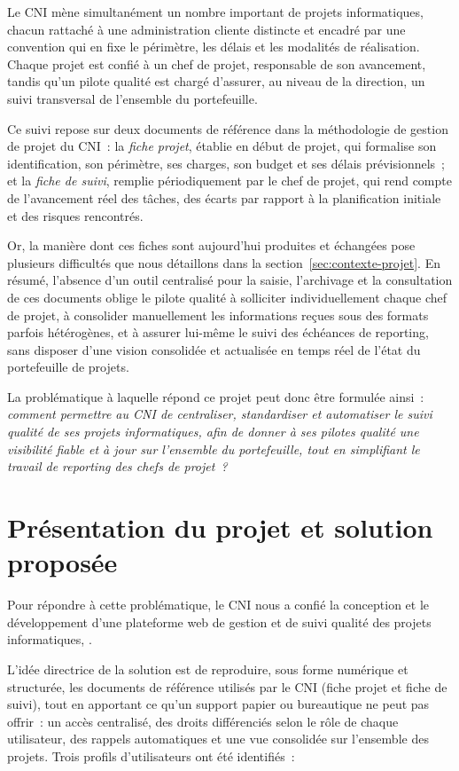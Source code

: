 Le CNI mène simultanément un nombre important de projets informatiques, chacun rattaché à une administration cliente distincte et encadré par une convention qui en fixe le périmètre, les délais et les modalités de réalisation. Chaque projet est confié à un chef de projet, responsable de son avancement, tandis qu'un pilote qualité est chargé d'assurer, au niveau de la direction, un suivi transversal de l'ensemble du portefeuille.

Ce suivi repose sur deux documents de référence dans la méthodologie de gestion de projet du CNI~: la \emph{fiche projet}, établie en début de projet, qui formalise son identification, son périmètre, ses charges, son budget et ses délais prévisionnels~; et la \emph{fiche de suivi}, remplie périodiquement par le chef de projet, qui rend compte de l'avancement réel des tâches, des écarts par rapport à la planification initiale et des risques rencontrés.

Or, la manière dont ces fiches sont aujourd'hui produites et échangées pose plusieurs difficultés que nous détaillons dans la section~\ref{sec:contexte-projet}. En résumé, l'absence d'un outil centralisé pour la saisie, l'archivage et la consultation de ces documents oblige le pilote qualité à solliciter individuellement chaque chef de projet, à consolider manuellement les informations reçues sous des formats parfois hétérogènes, et à assurer lui-même le suivi des échéances de reporting, sans disposer d'une vision consolidée et actualisée en temps réel de l'état du portefeuille de projets.

La problématique à laquelle répond ce projet peut donc être formulée ainsi~: \emph{comment permettre au CNI de centraliser, standardiser et automatiser le suivi qualité de ses projets informatiques, afin de donner à ses pilotes qualité une visibilité fiable et à jour sur l'ensemble du portefeuille, tout en simplifiant le travail de reporting des chefs de projet~?}

\section{Présentation du projet et solution proposée}
\label{sec:presentation-projet}

Pour répondre à cette problématique, le CNI nous a confié la conception et le développement d'une plateforme web de gestion et de suivi qualité des projets informatiques, .

L'idée directrice de la solution est de reproduire, sous forme numérique et structurée, les documents de référence utilisés par le CNI (fiche projet et fiche de suivi), tout en apportant ce qu'un support papier ou bureautique ne peut pas offrir~: un accès centralisé, des droits différenciés selon le rôle de chaque utilisateur, des rappels automatiques et une vue consolidée sur l'ensemble des projets. Trois profils d'utilisateurs ont été identifiés~:

